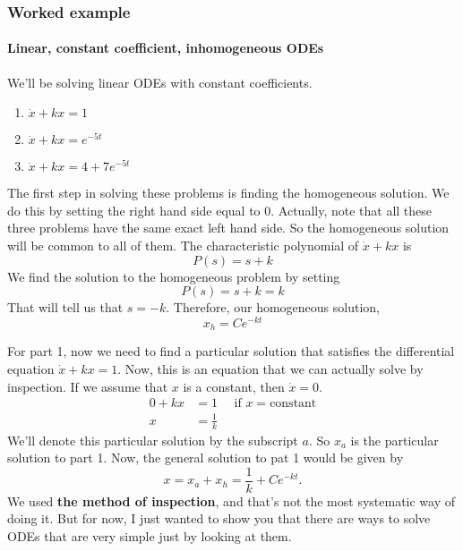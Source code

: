 \subsubsection{Worked example}
\paragraph{Linear, constant coefficient, inhomogeneous ODEs}
We'll be solving linear ODEs with constant coefficients. \\
\begin{enumerate}
\item $\dot{x} + kx = 1$
\item $\dot{x} + kx = e^{-5t}$
\item $\dot{x} + kx = 4 + 7 e^{-5t}$
\end{enumerate}
The first step in solving these problems is finding the homogeneous solution.
We do this by setting the right hand side equal to 0.
Actually, note that all these three problems have the same exact left hand side.
So the homogeneous solution will be common to all of them.
The characteristic polynomial of $\dot{x} + kx$ is
\begin{equation*}
  P(s) = s + k 
\end{equation*}
We find the solution to the homogeneous problem by setting
\begin{equation*}
  P(s) = s + k = k 
\end{equation*}
That will tell us that $s = -k$.
Therefore, our homogeneous solution,
\begin{equation*}
  x_h = C e^{-kt}
\end{equation*}

For part 1, now we need to find a particular solution
that satisfies the differential equation $\dot{x} + kx = 1$.  
Now, this is an equation that we can actually solve by inspection.
If we assume that $x$ is a constant, then $\dot{x} = 0$.
\begin{align*}
  0 + kx &= 1 \quad \text{ if } x = \text{constant} \\
  x &= \frac{1}{k} 
\end{align*}
We'll denote this particular solution by the subscript $a$.
So $x_a$ is the particular solution to part 1.
Now, the general solution to pat 1 would be given by
\begin{equation*}
  x = x_a + x_h = \frac{1}{k} + C e^{-kt}.
\end{equation*}
We used \textbf{the method of inspection}, and that's not the most systematic way of doing it.
But for now, I just wanted to show you that there are ways to solve ODEs that are very simple just
by looking at them.\\

